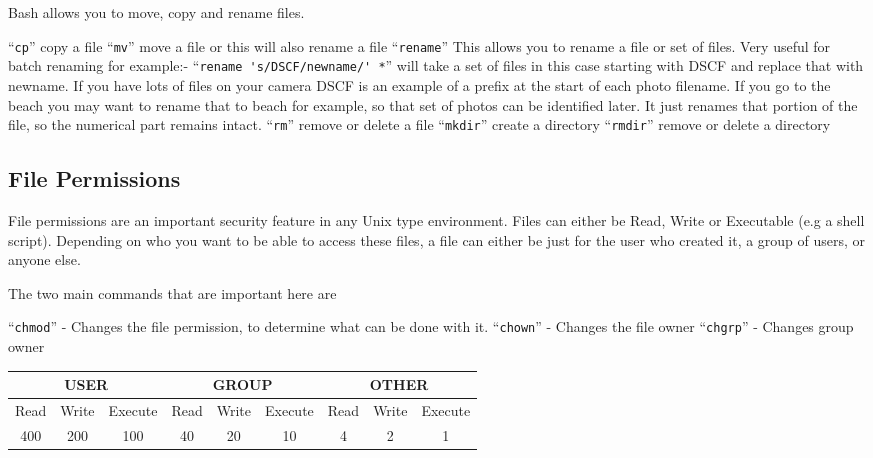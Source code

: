 \documentclass{extbook}
\begin{document}
Bash allows you to move, copy and rename files.

``\verb|cp|'' copy a file
``\verb|mv|'' move a file or this will also rename a file
``\verb|rename|'' This allows you to rename a file or set of files. Very useful for batch renaming for example:-
``\verb|rename 's/DSCF/newname/' *|'' will take a set of files in this case starting with DSCF and replace that with newname. If you have lots of files on your camera DSCF is an example of a prefix at the start of each photo filename. If you go to the beach you may want to rename that to beach for example, so that set of photos can be identified later. It just renames that portion of the file, so the numerical part remains intact.
``\verb|rm|'' remove or delete a file
``\verb|mkdir|'' create a directory
``\verb|rmdir|'' remove or delete a directory

\subsection{File Permissions}

File permissions are an important security feature in any Unix type environment. Files can either be Read, Write or Executable (e.g a shell script). Depending on who you want to be able to access these files, a file can either be just for the user who created it, a group of users, or anyone else.

The two main commands that are important here are

``\verb|chmod|'' - Changes the file permission, to determine what can be done with it.
``\verb|chown|'' - Changes the file owner
``\verb|chgrp|'' - Changes group owner

\begin{table}[h]
\begin{tabular}{|ccc|ccc|ccc|}
\hline
\multicolumn{3}{|c|}{\textbf{USER}}                               & \multicolumn{3}{c|}{\textbf{GROUP}}                              & \multicolumn{3}{c|}{\textbf{OTHER}}                              \\ \hline
\multicolumn{1}{|c|}{Read} & \multicolumn{1}{c|}{Write} & Execute & \multicolumn{1}{c|}{Read} & \multicolumn{1}{c|}{Write} & Execute & \multicolumn{1}{c|}{Read} & \multicolumn{1}{c|}{Write} & Execute \\ \hline
\multicolumn{1}{|c|}{400}  & \multicolumn{1}{c|}{200}   & 100     & \multicolumn{1}{c|}{40}   & \multicolumn{1}{c|}{20}    & 10      & \multicolumn{1}{c|}{4}    & \multicolumn{1}{c|}{2}     & 1       \\ \hline
\end{tabular}
\end{table}
\end{document}
